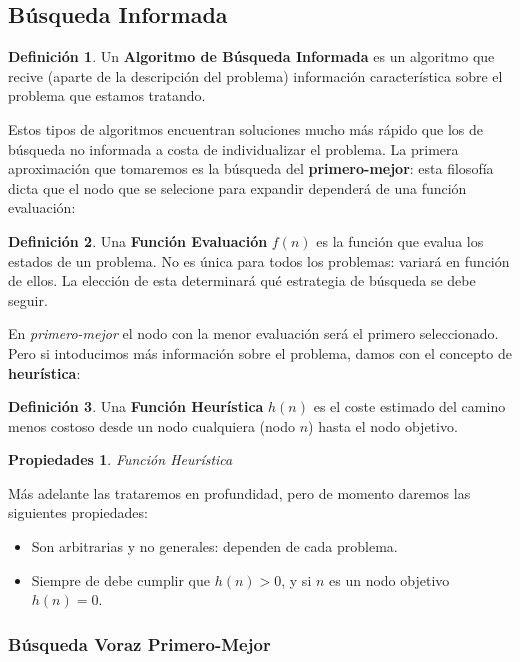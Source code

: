 \documentclass[12pt,a4paper,catalan, leqno]{article} %
\theoremstyle{definition}
\newtheorem*{propt}{Propiedades}
\newtheorem{defn}{Definición}[section]
\begin{document}
\subsection{Búsqueda Informada}

\begin{defn}
Un \textbf{Algoritmo de Búsqueda Informada} es un algoritmo que recive (aparte de la descripción del problema) información característica sobre el problema que estamos tratando.
\end{defn}

Estos tipos de algoritmos encuentran soluciones mucho más rápido que los de búsqueda no informada a costa de individualizar el problema. La primera aproximación que tomaremos es la búsqueda del \textbf{primero-mejor}: esta filosofía dicta que el nodo que se selecione para expandir dependerá de una función evaluación:

\begin{defn}
Una \textbf{Función Evaluación} $f(n)$ es la función que evalua los estados de un problema. No es única para todos los problemas: variará en función de ellos. La elección de esta determinará qué estrategia de búsqueda se debe seguir.
\end{defn}

En \textit{primero-mejor} el nodo con la menor evaluación será el primero seleccionado. Pero si intoducimos más información sobre el problema, damos con el concepto de \textbf{heurística}:

\begin{defn}
Una \textbf{Función Heurística} $h(n)$ es el coste estimado del camino menos costoso desde un nodo cualquiera (nodo $n$) hasta el nodo objetivo.
\end{defn}

\begin{propt} \textit{Función Heurística}

Más adelante las trataremos en profundidad, pero de momento daremos las siguientes propiedades:

\begin{itemize}
    \item Son arbitrarias y no generales: dependen de cada problema.
    \item Siempre de debe cumplir que $h(n) > 0$, y si $n$ es un nodo objetivo $h(n) = 0$.
    \end{itemize}
\end{propt}

\subsubsection{Búsqueda Voraz Primero-Mejor}
\end{document}
